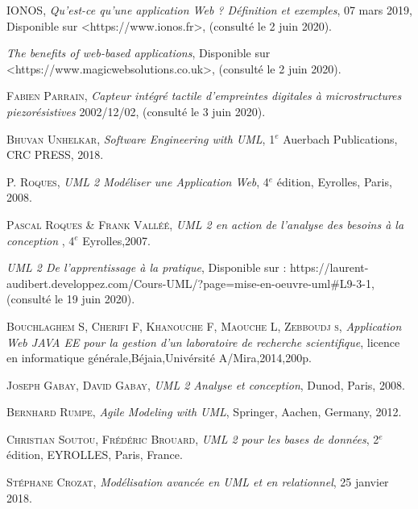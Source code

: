 \begin{thebibliography}{2}
		 \textsc{IONOS}, \emph{Qu’est-ce qu’une application Web ? Définition et exemples}, 07 mars 2019, Disponible sur <https://www.ionos.fr>, (consulté le 2 juin 2020). 
		
		
          \emph{The benefits of web-based applications}, Disponible sur  <https://www.magicwebsolutions.co.uk>, (consulté le 2 juin 2020).
        
         \textsc{Fabien Parrain},  \emph{Capteur intégré tactile d'empreintes digitales à microstructures piezorésistives 
        } 2002/12/02, (consulté le 3 juin 2020).
        
          \textsc{Bhuvan Unhelkar}, \emph{Software Engineering with UML}, 1$^e$ Auerbach Publications, CRC PRESS, 2018.
        
         P. \textsc{Roques}, \emph{UML 2 Modéliser une Application Web}, 4$^e$ édition, Eyrolles, Paris, 2008.
        
          \textsc{Pascal Roques \& Frank Valléé}, \emph{UML 2 en action de l'analyse des besoins à la conception }, 4$^e$ Eyrolles,2007.
        
          \emph{UML 2
De l'apprentissage à la pratique}, Disponible sur : https://laurent-audibert.developpez.com/Cours-UML/?page=mise-en-oeuvre-uml\#L9-3-1, (consulté le 19 juin 2020).
        
          \textsc{Bouchlaghem S, Cherifi F, Khanouche F, Maouche L, Zebboudj s}, \emph{Application Web JAVA EE pour la gestion d'un laboratoire de recherche scientifique}, licence en informatique générale,Béjaia,Univérsité A/Mira,2014,200p.
        
         \textsc{Joseph Gabay}, \textsc{David Gabay}, \emph{UML 2 Analyse et conception},  Dunod, Paris, 2008.
        
         \textsc{Bernhard Rumpe}, \emph{Agile Modeling with UML},  Springer, Aachen, Germany, 2012.
        
         \textsc{Christian Soutou}, \textsc{Frédéric Brouard}, \emph{UML 2 pour les bases de données}, 2$^e$ édition,  EYROLLES, Paris, France.

         \textsc{Stéphane Crozat}, \emph{Modélisation avancée en UML et en relationnel},  25 janvier 2018.   
        

\end{thebibliography}
